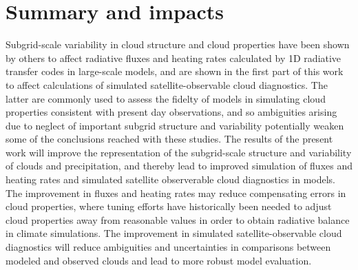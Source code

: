\documentclass[letter]{article}
\begin{document}
\section{Summary and impacts}
Subgrid-scale variability in cloud structure and cloud properties have been shown by others to affect radiative fluxes and heating rates calculated by 1D radiative transfer codes in large-scale models, and are shown in the first part of this work to affect calculations of simulated satellite-observable cloud diagnostics. The latter are commonly used to assess the fidelty of models in simulating cloud properties consistent with present day observations, and so ambiguities arising due to neglect of important subgrid structure and variability potentially weaken some of the conclusions reached with these studies. The results of the present work will improve the representation of the subgrid-scale structure and variability of clouds and precipitation, and thereby lead to improved simulation of fluxes and heating rates and simulated satellite observerable cloud diagnostics in models. The improvement in fluxes and heating rates may reduce compensating errors in cloud properties, where tuning efforts have historically been needed to adjust cloud properties away from reasonable values in order to obtain radiative balance in climate simulations. The improvement in simulated satellite-observable cloud diagnostics will reduce ambiguities and uncertainties in comparisons between modeled and observed clouds and lead to more robust model evaluation.


\end{document}
